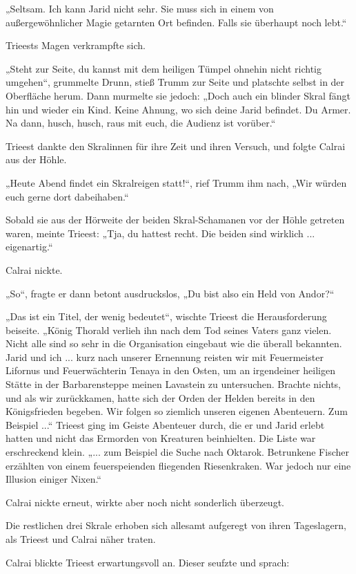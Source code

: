 „Seltsam. Ich kann Jarid nicht sehr. Sie muss sich in einem von außergewöhnlicher Magie getarnten Ort befinden. Falls sie überhaupt noch lebt.“

Trieests Magen verkrampfte sich.

„Steht zur Seite, du kannst mit dem heiligen Tümpel ohnehin nicht richtig umgehen“, grummelte Drunn, stieß Trumm zur Seite und platschte selbst in der Oberfläche herum. Dann murmelte sie jedoch: „Doch auch ein blinder Skral fängt hin und wieder ein Kind. Keine Ahnung, wo sich deine Jarid befindet. Du Armer. Na dann, husch, husch, raus mit euch, die Audienz ist vorüber.“

Trieest dankte den Skralinnen für ihre Zeit und ihren Versuch, und folgte Calrai aus der Höhle.

„Heute Abend findet ein Skralreigen statt!“, rief Trumm ihm nach, „Wir würden euch gerne dort dabeihaben.“

Sobald sie aus der Hörweite der beiden Skral-Schamanen vor der Höhle getreten waren, meinte Trieest: „Tja, du hattest recht. Die beiden sind wirklich ... eigenartig.“

Calrai nickte.

„So“, fragte er dann betont ausdruckslos, „Du bist also ein Held von Andor?“

„Das ist ein Titel, der wenig bedeutet“, wischte Trieest die Herausforderung beiseite. „König Thorald verlieh ihn nach dem Tod seines Vaters ganz vielen. Nicht alle sind so sehr in die Organisation eingebaut wie die überall bekannten. Jarid und ich ... kurz nach unserer Ernennung reisten wir mit Feuermeister Lifornus und Feuerwächterin Tenaya in den Osten, um an irgendeiner heiligen Stätte in der Barbarensteppe meinen Lavastein zu untersuchen. Brachte nichts, und als wir zurückkamen, hatte sich der Orden der Helden bereits in den Königsfrieden begeben. Wir folgen so ziemlich unseren eigenen Abenteuern. Zum Beispiel ...“ Trieest ging im Geiste Abenteuer durch, die er und Jarid erlebt hatten und nicht das Ermorden von Kreaturen beinhielten. Die Liste war erschreckend klein. „... zum Beispiel die Suche nach Oktarok. Betrunkene Fischer erzählten von einem feuerspeienden fliegenden Riesenkraken. War jedoch nur eine Illusion einiger Nixen.“

Calrai nickte erneut, wirkte aber noch nicht sonderlich überzeugt.

Die restlichen drei Skrale erhoben sich allesamt aufgeregt von ihren Tageslagern, als Trieest und Calrai näher traten.

Calrai blickte Trieest erwartungsvoll an. Dieser seufzte und sprach:

